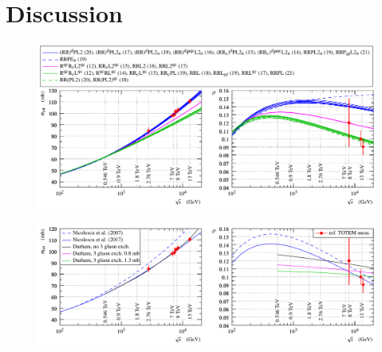 \section{Discussion}
\label{sec:discussion}

\begin{figure}
\vskip-5mm
\begin{center}
\includegraphics{fig/compete_bands_si_tot_rho.pdf}
\caption{%
}
\label{fig:comp bands}
\end{center}
\end{figure}




\begin{figure}
\vskip-5mm
\begin{center}
\includegraphics{fig/matching_models_si_tot_rho.pdf}
\caption{%
}
\label{fig:match models}
\end{center}
\end{figure}
